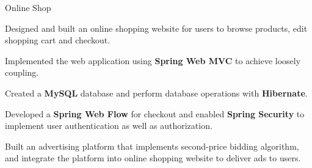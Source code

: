 \begin{cvprojects}
    \cvproject
    {Online Shop}
    {}
    {}
    {
      \begin{cvitems}
        \item {Designed and built an online shopping website for users to browse products, edit shopping cart and checkout.}
        \item {Implemented the web application using \textbf{Spring Web MVC} to achieve loosely coupling. }
        \item {Created a \textbf{MySQL} database and perform database operations with \textbf{Hibernate}.}
        \item {Developed a \textbf{Spring Web Flow} for checkout and enabled \textbf{Spring Security} to implement user authentication as well as authorization.}
        \item {Built an advertising platform that implements second-price bidding algorithm, and integrate the platform into online shopping website to deliver ads to users.}
      \end{cvitems}
    }
    
    
    

    

    
 
\end{cvprojects}
